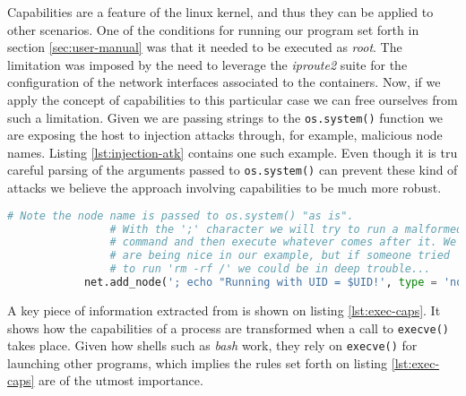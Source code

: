         Capabilities are a feature of the linux kernel, and thus they can be applied to other scenarios. One of the conditions for running our program set forth in section \ref{sec:user-manual} was that it needed to be executed as \textit{root}. The limitation was imposed by the need to leverage the \textit{iproute2} suite for the configuration of the network interfaces associated to the containers. Now, if we apply the concept of capabilities to this particular case we can free ourselves from such a limitation. Given we are passing strings to the \texttt{os.system()} function we are exposing the host to injection attacks through, for example, malicious node names. Listing \ref{lst:injection-atk} contains one such example. Even though it is tru careful parsing of the arguments passed to \texttt{os.system()} can prevent these kind of attacks we believe the approach involving capabilities to be much more robust.\\

        \begin{lstlisting}[language = python, caption = A Malicious Node Name Exploiting Privileges., label = lst:injection-atk]
            # Note the node name is passed to os.system() "as is".
                # With the ';' character we will try to run a malformed
                # command and then execute whatever comes after it. We
                # are being nice in our example, but if someone tried
                # to run 'rm -rf /' we could be in deep trouble...
            net.add_node('; echo "Running with UID = $UID!', type = 'node')
        \end{lstlisting}

        A key piece of information extracted from \cite{bib:man-capabilities} is shown on listing \ref{lst:exec-caps}. It shows how the capabilities of a process are transformed when a call to \texttt{execve()} \cite{bib:man-execve} takes place. Given how shells such as \textit{bash} \cite{bib:man-bash} work, they rely on \texttt{execve()} for launching other programs, which implies the rules set forth on listing \ref{lst:exec-caps} are of the utmost importance.\\

